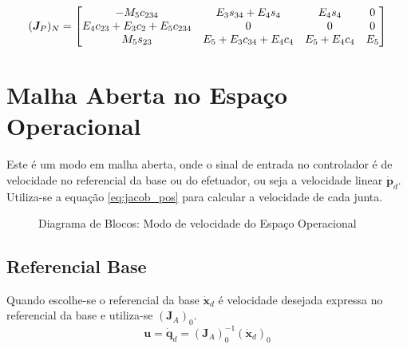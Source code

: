 \begin{equation}
(\bm{J}_P)_N =  
\begin{bmatrix}
    -M_5c_{234} & E_3s_{34}+E_4s_4 & E_4s_4 & 0 \\
    E_4c_{23}+E_3c_2+E_5c_{234} & 0 & 0 & 0 \\
    M_5s_{23} &  E_5+E_3c_{34}+E_4c_4 & E_5+E_4c_4 & E_5 
\end{bmatrix}
\end{equation}




\section{Malha Aberta no Espaço Operacional} 
Este é um modo em malha aberta, onde o sinal de entrada no controlador é de velocidade no referencial da base ou do efetuador, ou seja a velocidade linear $\bm{\dot{p}}_d$. Utiliza-se a equação \eqref{eq:jacob_pos} para calcular a velocidade de cada junta. 

\begin{figure}[h!]
\centering
{}
\caption{Diagrama de Blocos: Modo de velocidade do Espaço Operacional}
\label{fig:vel_op}
\end{figure}


\subsection{Referencial Base} \label{sec:openloopbase}
Quando escolhe-se o referencial da base $\bm{\dot{x}}_d$ é velocidade desejada expressa no referencial da base e utiliza-se $(\bm{J}_{A})_0$.
\begin{equation}
\bm{u} = \bm{\dot{q}}_d = (\bm{J}_{A})_0^{-1} (\bm{\dot{x}}_d)_0
\end{equation}
